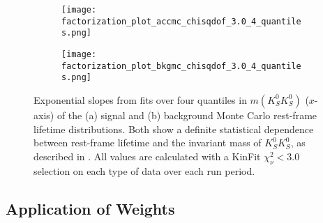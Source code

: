 \begin{figure}
  \begin{center}
    \begin{subfigure}[b]{.8\columnwidth}
      \texttt{[image: factorization\_plot\_accmc\_chisqdof\_3.0\_4\_quantiles.png]}
      \caption{}
      \label{fig:mc-factorization-fits-a}
    \end{subfigure}
    \begin{subfigure}[b]{.8\columnwidth}
      \texttt{[image: factorization\_plot\_bkgmc\_chisqdof\_3.0\_4\_quantiles.png]}
      \caption{}
      \label{fig:mc-factorization-fits-b}
    \end{subfigure}
  \end{center}
  \caption{Exponential slopes from fits over four quantiles in $m(K_S^0K_S^0)$ ($x$-axis) of the (a) signal and (b) background Monte Carlo rest-frame lifetime distributions. Both show a definite statistical dependence between rest-frame lifetime and the invariant mass of $K_S^0K_S^0$, as described in . All values are calculated with a KinFit $\chi^2_\nu < 3.0$ selection on each type of data over each run period.}\label{fig:mc-factorization-fits}
\end{figure}

\subsection{Application of Weights}\label{sec:application-of-weights}

